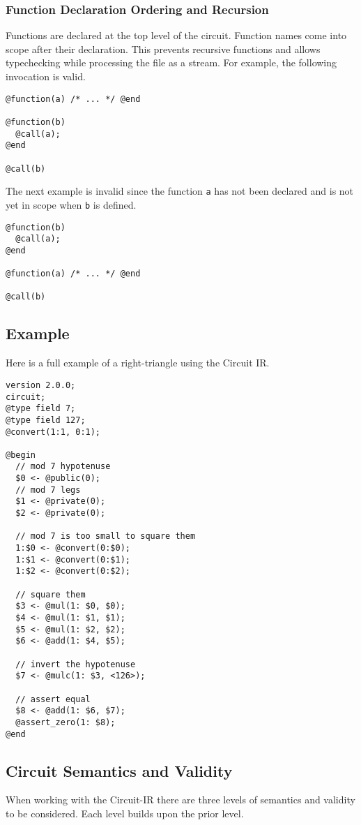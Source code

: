 \subsubsection{Function Declaration Ordering and Recursion}
Functions are declared at the top level of the circuit. 
Function names come into scope after their declaration. 
This prevents recursive functions and allows typechecking while processing the file as a stream.
%
For example, the following invocation is valid.
\begin{lstlisting}[language=ir]
@function(a) /* ... */ @end

@function(b)
  @call(a);
@end

@call(b)
\end{lstlisting}
The next example is invalid since the function \texttt{a} has not been declared and is not yet in scope when \texttt{b} is defined.
\begin{lstlisting}[language=ir]
@function(b)
  @call(a);
@end

@function(a) /* ... */ @end

@call(b)
\end{lstlisting}

\subsection{Example}
Here is a full example of a right-triangle using the Circuit IR.
%
\begin{lstlisting}[language=ir]
version 2.0.0;
circuit;
@type field 7;
@type field 127;
@convert(1:1, 0:1);

@begin
  // mod 7 hypotenuse
  $0 <- @public(0);
  // mod 7 legs
  $1 <- @private(0);
  $2 <- @private(0);

  // mod 7 is too small to square them
  1:$0 <- @convert(0:$0);
  1:$1 <- @convert(0:$1);
  1:$2 <- @convert(0:$2);

  // square them
  $3 <- @mul(1: $0, $0);
  $4 <- @mul(1: $1, $1);
  $5 <- @mul(1: $2, $2);
  $6 <- @add(1: $4, $5);

  // invert the hypotenuse
  $7 <- @mulc(1: $3, <126>);

  // assert equal
  $8 <- @add(1: $6, $7);
  @assert_zero(1: $8);
@end
\end{lstlisting}

\subsection{Circuit Semantics and Validity}\label{circuit_ir_validity}
When working with the Circuit-IR there are three levels of semantics and validity to be considered.
Each level builds upon the prior level.

